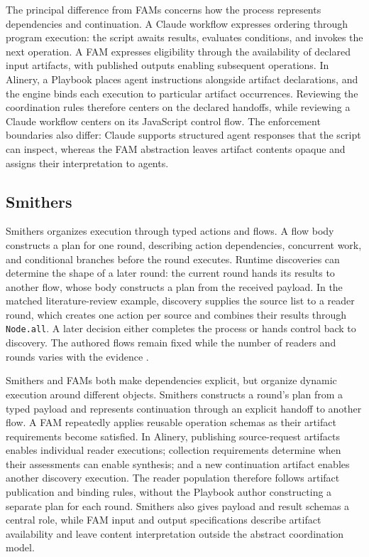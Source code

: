 \documentclass[letterpaper]{article}
\theoremstyle{definition}
\begin{document}
The principal difference from FAMs concerns how the process represents
dependencies and continuation. A Claude workflow expresses ordering through
program execution: the script awaits results, evaluates conditions, and invokes
the next operation. A FAM expresses eligibility through the availability of
declared input artifacts, with published outputs enabling subsequent
operations. In Alinery, a Playbook places agent instructions alongside artifact
declarations, and the engine binds each execution to particular artifact
occurrences. Reviewing the coordination rules therefore centers on the
declared handoffs, while reviewing a Claude workflow centers on its JavaScript
control flow. The enforcement boundaries also differ: Claude supports
structured agent responses that the script can inspect, whereas the FAM
abstraction leaves artifact contents opaque and assigns their interpretation
to agents.

\subsection{Smithers}

Smithers organizes execution through typed actions and flows. A flow body
constructs a plan for one round, describing action dependencies, concurrent
work, and conditional branches before the round executes. Runtime discoveries
can determine the shape of a later round: the current round hands its results
to another flow, whose body constructs a plan from the received payload. In
the matched literature-review example, discovery supplies the source list to
a reader round, which creates one action per source and combines their results
through \texttt{Node.all}. A later decision either completes the process or
hands control back to discovery. The authored flows remain fixed while the
number of readers and rounds varies with the evidence
\cite{smithers2026plans,smithers2026rounds}.

Smithers and FAMs both make dependencies explicit, but organize dynamic
execution around different objects. Smithers constructs a round's plan from
a typed payload and represents continuation through an explicit handoff to
another flow. A FAM repeatedly applies reusable operation schemas as their
artifact requirements become satisfied. In Alinery, publishing source-request
artifacts enables individual reader executions; collection requirements
determine when their assessments can enable synthesis; and a new continuation
artifact enables another discovery execution. The reader population therefore
follows artifact publication and binding rules, without the Playbook author
constructing a separate plan for each round. Smithers also gives payload and
result schemas a central role, while FAM input and output specifications
describe artifact availability and leave content interpretation outside the
abstract coordination model.
\end{document}
